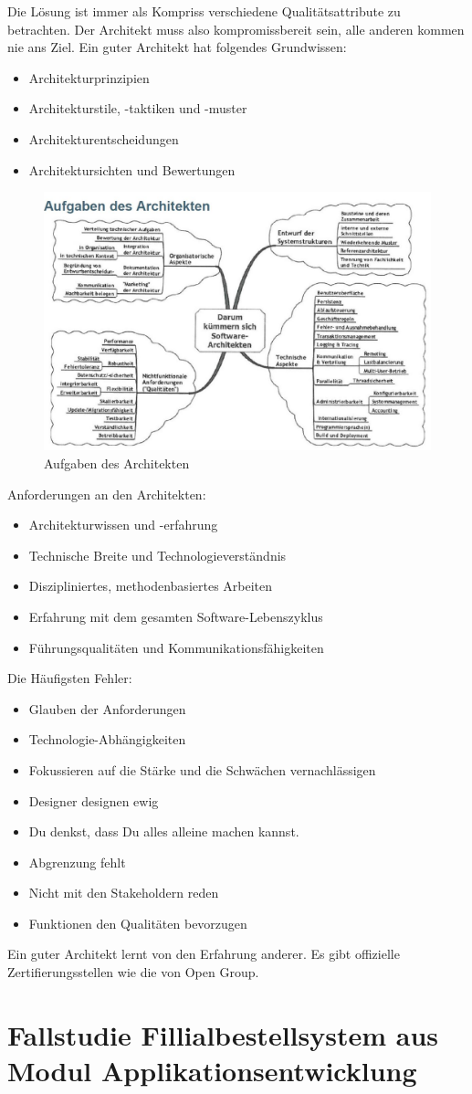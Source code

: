 Die Lösung ist immer als Kompriss verschiedene Qualitätsattribute zu betrachten. Der Architekt muss also kompromissbereit sein, alle anderen kommen nie ans Ziel. Ein guter Architekt hat folgendes Grundwissen:

\begin{itemize}
	\item Architekturprinzipien
	\item Architekturstile, -taktiken und -muster
	\item Architekturentscheidungen
	\item Architektursichten und Bewertungen
\end{itemize}

\begin{figure}[h!]
\centering
\includegraphics[width=0.7\linewidth]{fig/aufgaben-des-architekten}
\caption{Aufgaben des Architekten}
\label{fig:aufgaben-des-architekten}
\end{figure}

Anforderungen an den Architekten:

\begin{itemize}
	\item Architekturwissen und -erfahrung
	\item Technische Breite und Technologieverständnis
	\item Diszipliniertes, methodenbasiertes Arbeiten
	\item Erfahrung mit dem gesamten Software-Lebenszyklus
	\item Führungsqualitäten und Kommunikationsfähigkeiten
\end{itemize}

Die Häufigsten Fehler:
\begin{itemize}
	\item Glauben der Anforderungen
	\item Technologie-Abhängigkeiten
	\item Fokussieren auf die Stärke und die Schwächen vernachlässigen
	\item Designer designen ewig
	\item Du denkst, dass Du alles alleine machen kannst.
	\item Abgrenzung fehlt
	\item Nicht mit den Stakeholdern reden
	\item Funktionen den Qualitäten bevorzugen
\end{itemize}

Ein guter Architekt lernt von den Erfahrung anderer. Es gibt offizielle Zertifierungsstellen wie die von Open Group.


\section{Fallstudie Fillialbestellsystem aus Modul Applikationsentwicklung}